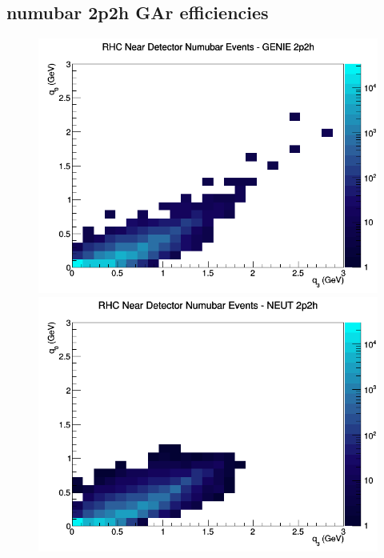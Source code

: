\documentclass[12pt]{article}
\begin{document}
\subsection{numubar 2p2h GAr efficiencies}
\begin{figure}[h]
\includegraphics[width=\linewidth]{eff_q0_q3/GAr/2p2h_RHC_ND_numubar_q3_q0_GENIE.png}
\endminipage
{}
\includegraphics[width=\linewidth]{eff_q0_q3/GAr/2p2h_RHC_ND_numubar_q3_q0_NEUT.png}
\endminipage
{}

\end{figure}
\end{document}
